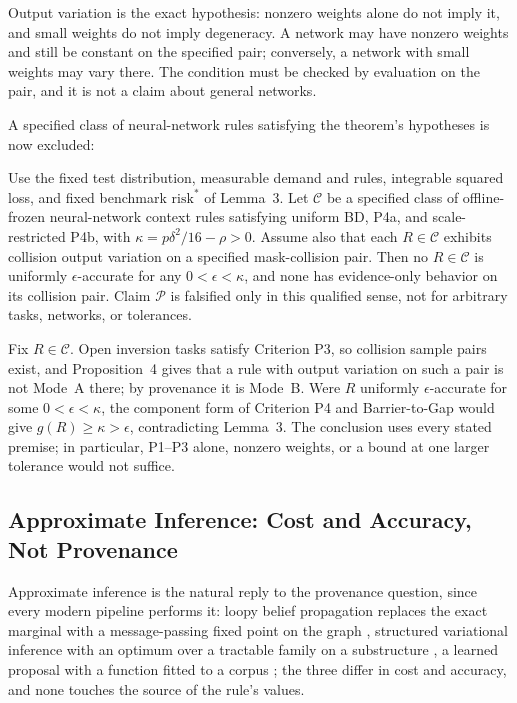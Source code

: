 Output variation is the exact hypothesis: nonzero weights alone do not imply it, and small weights do not imply degeneracy. A network may have nonzero weights and still be constant on the specified pair; conversely, a network with small weights may vary there. The condition must be checked by evaluation on the pair, and it is not a claim about general networks.

A specified class of neural-network rules satisfying the theorem's hypotheses is now excluded:

\begin{theorem}
Use the fixed test distribution, measurable demand and rules, integrable squared loss, and fixed benchmark $\mathrm{risk}^*$ of Lemma~3. Let $\mathcal{C}$ be a specified class of offline-frozen neural-network context rules satisfying uniform BD, P4a, and scale-restricted P4b, with $\kappa = p\delta^2/16-\rho>0$. Assume also that each $R\in\mathcal{C}$ exhibits collision output variation on a specified mask-collision pair. Then no $R\in\mathcal{C}$ is uniformly $\epsilon$-accurate for any $0<\epsilon<\kappa$, and none has evidence-only behavior on its collision pair. Claim $\mathcal{P}$ is falsified only in this qualified sense, not for arbitrary tasks, networks, or tolerances.
\end{theorem}

\argument Fix $R\in\mathcal{C}$. Open inversion tasks satisfy Criterion P3, so collision sample pairs exist, and Proposition~4 gives that a rule with output variation on such a pair is not Mode~A there; by provenance it is Mode~B. Were $R$ uniformly $\epsilon$-accurate for some $0<\epsilon<\kappa$, the component form of Criterion P4 and Barrier-to-Gap would give $g(R)\ge\kappa>\epsilon$, contradicting Lemma~3. The conclusion uses every stated premise; in particular, P1--P3 alone, nonzero weights, or a bound at one larger tolerance would not suffice.\qedbox

\subsection{Approximate Inference: Cost and Accuracy, Not Provenance}

Approximate inference is the natural reply to the provenance question, since every modern pipeline performs it: loopy belief propagation replaces the exact marginal with a message-passing fixed point on the graph \citep{pearl1988,murphy1999,yedidia2005}, structured variational inference with an optimum over a tractable family on a substructure \citep{saul1996,wainwright2008}, a learned proposal with a function fitted to a corpus \citep{mnih2014}; the three differ in cost and accuracy, and none touches the source of the rule's values.

